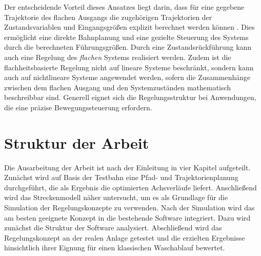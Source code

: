 Der entscheidende Vorteil dieses Ansatzes liegt darin, dass für eine gegebene Trajektorie des flachen Ausgangs die zugehörigen Trajektorien der Zustandsvariablen und Eingangsgrößen explizit berechnet werden können \cite{flachheit}. Dies ermöglicht eine direkte Bahnplanung und eine gezielte Steuerung des Systems durch die berechneten Führungsgrößen. Durch eine Zustandsrückführung kann auch eine Regelung des \textit{flachen} Systems realisiert werden. Zudem ist die flachheitsbasierte Regelung nicht auf lineare Systeme beschränkt, sondern kann auch auf nichtlineare Systeme angewendet werden, sofern die Zusammenhänge zwischen dem flachen Ausgang und den Systemzuständen mathematisch beschreibbar sind.
Generell eignet sich die Regelungsstruktur bei Anwendungen, die eine präzise Bewegungssteuerung erfordern.

\section{Struktur der Arbeit}
Die Ausarbeitung der Arbeit ist nach der Einleitung in vier Kapitel aufgeteilt. Zunächst wird auf Basis der Testbahn eine Pfad- und Trajektorienplanung durchgeführt, die als Ergebnis die optimierten Achsverläufe liefert. Anschließend wird das Streckenmodell näher untersucht, um es als Grundlage für die Simulation der Regelungskonzepte zu verwenden. Nach der Simulation wird das am besten geeignete Konzept in die bestehende Software integriert. Dazu wird zunächst die Struktur der Software analysiert. Abschließend wird das Regelungskonzept an der realen Anlage getestet und die erzielten Ergebnisse hinsichtlich ihrer Eignung für einen klassischen Waschablauf bewertet.

